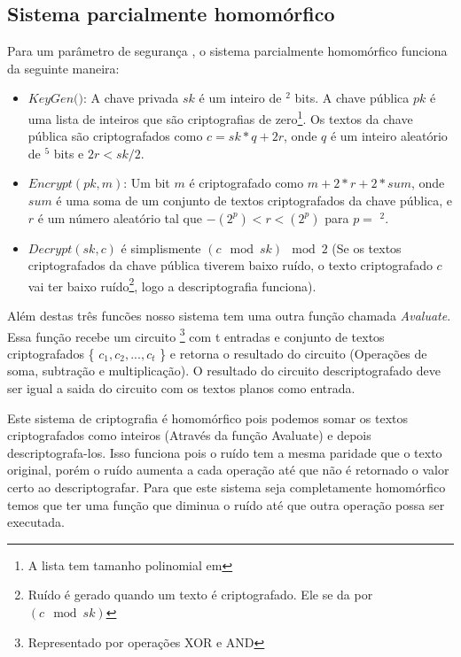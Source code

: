 	\subsection{Sistema parcialmente homomórfico}
	Para um parâmetro de segurança \textlambda, o sistema parcialmente homomórfico funciona da seguinte maneira:
	\begin{itemize}
		\item \(KeyGen(\)\textlambda\()\): A chave privada \(sk\) é um inteiro de \textlambda \(^2\)  bits. A chave pública \(pk\) é uma lista de inteiros que são criptografias de zero\footnote{A lista tem tamanho polinomial em \textlambda}. Os textos da chave pública são criptografados como \(c = sk*q + 2r\), onde \(q\) é um inteiro aleatório de \textlambda \(^5\) bits e \( 2r < sk/2 \).
		\item \(Encrypt(pk,m)\): Um bit \(m\) é criptografado como \(m + 2*r + 2*sum\), onde \(sum\) é uma soma de um conjunto de textos criptografados da chave pública, e \( r \) é um número aleatório tal que \( -(2^p) < r < (2^p) \) para \( p = \) \textlambda  \(^2 \).
		\item \(Decrypt(sk,c)\) é simplismente \((c \mod sk) \mod 2\) (Se os textos criptografados da chave pública tiverem baixo ruído, o texto criptografado \(c\) vai ter baixo ruído\footnote{Ruído é gerado quando um texto é criptografado. Ele se da por \((c \mod sk)\)}, logo a descriptografia funciona).
	\end{itemize}
	Além destas três funcões nosso sistema tem uma outra função chamada \textit{Avaluate}. Essa função recebe um circuito \footnote{Representado por operações XOR e AND} com t entradas e conjunto de textos criptografados \{ \( c_1,c_2,...,c_t \) \} e retorna o resultado do circuito (Operações de soma, subtração e multiplicação). O resultado do circuito descriptografado deve ser igual a saida do circuito com os textos planos como entrada.

	Este sistema de criptografia é homomórfico pois podemos somar os textos criptografados como inteiros (Através da função Avaluate) e depois descriptografa-los. Isso funciona pois o ruído tem a mesma paridade que o texto original, porém o ruído aumenta a cada operação até que não é retornado o valor certo ao descriptografar.
Para que este sistema seja completamente homomórfico temos que ter uma função que diminua o ruído até que outra operação possa ser executada.

